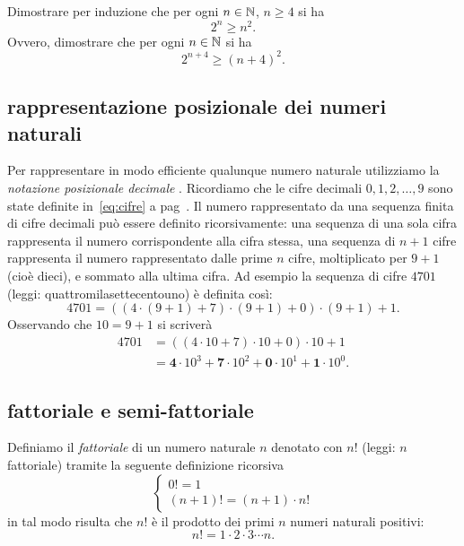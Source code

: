 \begin{exercise}
  Dimostrare per induzione che per ogni $n\in {\mathbb N}$, $n\ge 4$ si ha 
  \[  
    2^n \ge n^2.
  \]
  Ovvero, dimostrare che per ogni $n\in {\mathbb N}$ si ha 
  \[
    2^{n+4} \ge (n+4)^2.  
  \]
\end{exercise}

\subsection{rappresentazione posizionale dei numeri naturali}

Per rappresentare in modo efficiente qualunque numero naturale utilizziamo la 
\emph{notazione posizionale decimale}%
%
.
Ricordiamo che le cifre decimali $0,1,2,\dots, 9$ sono state definite in~\eqref{eq:cifre}
a pag~\pageref{eq:cifre}.
Il numero rappresentato da una sequenza finita di cifre decimali può essere 
definito ricorsivamente: una sequenza di una sola cifra rappresenta il numero 
corrispondente alla cifra stessa, una sequenza di $n+1$ cifre rappresenta il 
numero rappresentato dalle prime $n$ cifre, moltiplicato per $9+1$ (cioè dieci),
e sommato alla ultima cifra. 
Ad esempio la sequenza di cifre $4701$ (leggi: quattromilasettecentouno)
è definita così:
\[ 
  4701 = ((4\cdot(9+1)+7)\cdot(9+1)+0)\cdot(9+1)+1.
\]
Osservando che $10 = 9+1$ si scriverà
\begin{align*}
  4701 
  & = ((4\cdot 10 + 7)\cdot 10 +0)\cdot 10 + 1 \\
  & = \mathbf 4\cdot 10^3 + \mathbf 7\cdot 10^2 + \mathbf 0\cdot 10^1 + \mathbf 1 \cdot 10^0. 
\end{align*}

\subsection{fattoriale e semi-fattoriale}

Definiamo il 
\emph{fattoriale}%
%
%
%
di un numero naturale $n$
denotato con $n!$ (leggi: $n$ fattoriale) 
tramite la seguente definizione ricorsiva
\[
  \begin{cases}
    0! = 1 \\
    (n+1)! = (n+1) \cdot n!
  \end{cases}
\]
in tal modo risulta che $n!$ è il prodotto dei primi $n$ numeri naturali positivi:
\[
  n! = 1 \cdot 2 \cdot 3 \cdots n.  
\]


